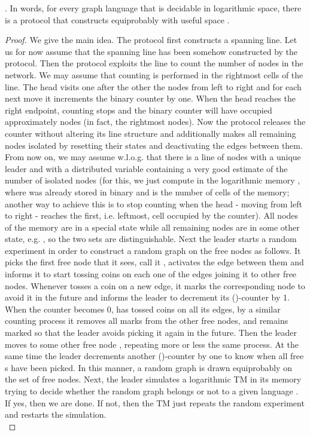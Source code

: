 \documentclass[oribibl, 11pt]{llncs}
\begin{document}
\begin{theorem}  \label{the:logar}
. In words, for every graph language  that is decidable in logarithmic space, there is a protocol that constructs  equiprobably with useful space .
\end{theorem}
\begin{proof}
We give the main idea. The protocol first constructs a spanning line. Let us for now assume that the spanning line has been somehow constructed by the protocol. Then the protocol exploits the line to count the number of nodes in the network. We may assume that counting is performed in the rightmost cells of the line. The head visits one after the other the nodes from left to right and for each next move it increments the binary counter by one. When the head reaches the right endpoint, counting stops and the binary counter will have occupied approximately  nodes (in fact, the rightmost  nodes). Now the protocol releases the counter without altering its line structure and additionally makes all remaining  nodes isolated by resetting their states and deactivating the edges between them. From now on, we may assume w.l.o.g. that there is a line of  nodes with a unique leader and with a distributed variable containing a very good estimate of the number of isolated nodes (for this, we just compute in the logarithmic memory , where  was already stored in binary and  is the number of cells of the memory; another way to achieve this is to stop counting when the head - moving from left to right - reaches the first, i.e. leftmost, cell occupied by the counter). All nodes of the memory are in a special  state while all remaining nodes are in some other state, e.g. , so the two sets are distinguishable. Next the leader starts a random experiment in order to construct a random graph on the free nodes as follows. It picks the first free node that it sees, call it , activates the edge between them and informs it to start tossing coins on each one of the edges joining it to other free nodes. Whenever  tosses a coin on a new edge, it marks the corresponding node to avoid it in the future and informs the leader to decrement its ()-counter by 1. When the counter becomes 0,  has tossed coins on all its edges, by a similar counting process it removes all marks from the other free nodes, and remains marked so that the leader avoids picking it again in the future. Then the leader moves to some other free node , repeating more or less the same process. At the same time the leader decrements another ()-counter by one to know when all free s have been picked. In this manner, a random graph is drawn equiprobably on the set of free nodes. Next, the leader simulates a logarithmic TM in its memory trying to decide whether the random graph belongs or not to a given language . If yes, then we are done. If not, then the TM just repeats the random experiment and restarts the simulation.\\


\end{proof}
\end{document}
